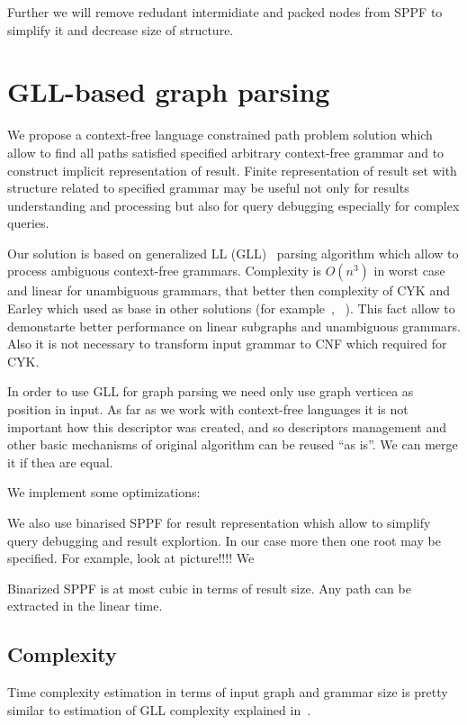 \documentclass{sig-alternate} %
\begin{document}
Further we will remove redudant intermidiate and packed nodes from SPPF to simplify it and decrease size of structure.


\section{GLL-based graph parsing}
We propose a context-free language constrained path problem solution which allow to find all paths satisfied specified arbitrary context-free grammar and to construct implicit representation of result. 
Finite representation of result set with structure related to specified grammar may be useful not only for results understanding and processing but also for query debugging especially for complex queries. 

Our solution is based on generalized LL (GLL)~\cite{scott2010gll, FastPracticalGLL} parsing algorithm which allow to process ambiguous context-free grammars.
Complexity is $O(n^3)$ in worst case and linear for unambiguous grammars, that better then complexity of CYK and Earley which used as base in other solutions (for example~\cite{ConjCFPathQuery}, ~\cite{GraphQueryWithEarley}).
This fact allow to demonstarte better performance on linear subgraphs and unambiguous grammars.
Also it is not necessary to transform input grammar to CNF which required for CYK.

In order to use GLL for graph parsing we need only use graph verticea as position in input.
As far as we work with context-free languages it is not important how this descriptor was created, and so descriptors management and other basic mechanisms of original algorithm can be reused ``as is''. 
We can merge it if thea are equal. 

We implement some optimizations:~\cite{FastPracticalGLL}

We also use binarised SPPF for result representation whish allow to simplify query debugging and result explortion.
In our case more then one root may be specified. For example, look at picture!!!! 
We 

Binarized SPPF is at most cubic in terms of result size. Any path can be extracted in the linear time.

\subsection{Complexity}

Time complexity estimation in terms of input graph and grammar size is pretty similar to estimation of GLL complexity explained in~\cite{modellingGLL}.
\end{document}
